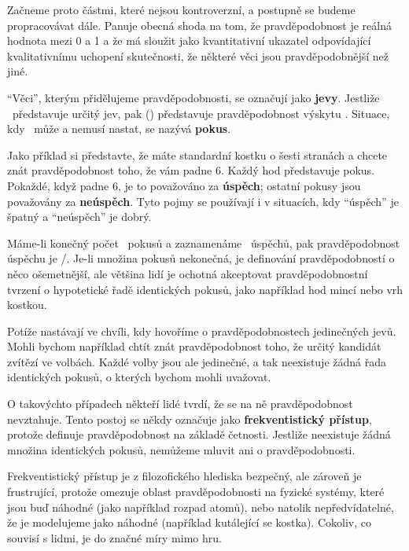 \documentclass[12pt]{book}
\begin{document}
Začneme proto částmi, které nejsou kontroverzní, a postupně se budeme propracovávat dále. Panuje obecná shoda na tom, že pravděpodobnost je reálná hodnota mezi 0 a 1 a že má sloužit jako kvantitativní ukazatel odpovídající kvalitativnímu uchopení skutečnosti, že některé věci jsou pravděpodobnější než jiné.

``Věci'', kterým přidělujeme pravděpodobnosti, se označují jako {\bf jevy}.  Jestliže
\E~představuje určitý jev, pak \Prob(\E) představuje pravděpodobnost výskytu
\E.  Situace, kdy \E~může a nemusí nastat, se nazývá {\bf pokus}.

Jako příklad si představte, že máte standardní kostku o šesti stranách a chcete znát pravděpodobnost toho, že vám padne 6.  Každý hod představuje pokus. Pokaždé, když padne 6, je to považováno za {\bf úspěch}; ostatní pokusy jsou považovány za {\bf neúspěch}.  Tyto pojmy se používají i v situacích, kdy ``úspěch'' je špatný a ``neúspěch'' je dobrý.

Máme-li konečný počet \n~pokusů a zaznamenáme \s~úspěchů, pak pravděpodobnost úspěchu je \s/\n.  Je-li množina pokusů nekonečná, je definování pravděpodobností o něco ošemetnější, ale většina lidí je ochotná akceptovat pravděpodobnostní tvrzení o hypotetické řadě identických pokusů, jako například hod mincí nebo vrh kostkou.

Potíže nastávají ve chvíli, kdy hovoříme o pravděpodobnostech jedinečných jevů. Mohli bychom například chtít znát pravděpodobnost toho, že určitý kandidát zvítězí ve volbách. Každé volby jsou ale jedinečné, a tak neexistuje žádná řada identických pokusů, o kterých bychom mohli uvažovat.

O takovýchto případech někteří lidé tvrdí, že se na ně pravděpodobnost nevztahuje. Tento postoj se někdy označuje jako {\bf
frekventistický přístup}, protože definuje pravděpodobnost na základě četnosti. Jestliže neexistuje žádná množina identických pokusů, nemůžeme mluvit ani o pravděpodobnosti.

Frekventistický přístup je z filozofického hlediska bezpečný, ale zároveň je frustrující, protože omezuje oblast pravděpodobnosti na fyzické systémy, které jsou buď náhodné (jako například rozpad atomů), nebo natolik nepředvídatelné, že je modelujeme jako náhodné (například kutálející se kostka). Cokoliv, co souvisí s lidmi, je do značné míry mimo hru.
\end{document}
